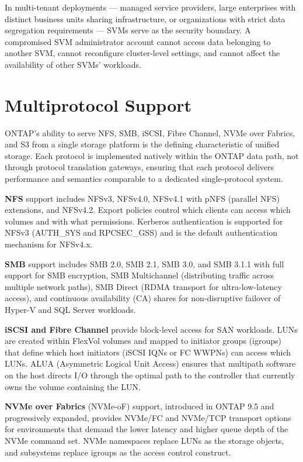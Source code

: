 In multi-tenant deployments --- managed service providers, large enterprises with distinct business units sharing infrastructure, or organizations with strict data segregation requirements --- SVMs serve as the security boundary. A compromised SVM administrator account cannot access data belonging to another SVM, cannot reconfigure cluster-level settings, and cannot affect the availability of other SVMs' workloads.

\section{Multiprotocol Support}

ONTAP's ability to serve NFS, SMB, iSCSI, Fibre Channel, NVMe over Fabrics, and S3 from a single storage platform is the defining characteristic of unified storage. Each protocol is implemented natively within the ONTAP data path, not through protocol translation gateways, ensuring that each protocol delivers performance and semantics comparable to a dedicated single-protocol system.

\textbf{NFS} support includes NFSv3, NFSv4.0, NFSv4.1 with pNFS (parallel NFS) extensions, and NFSv4.2. Export policies control which clients can access which volumes and with what permissions. Kerberos authentication is supported for NFSv3 (AUTH\_SYS and RPCSEC\_GSS) and is the default authentication mechanism for NFSv4.x.

\textbf{SMB} support includes SMB 2.0, SMB 2.1, SMB 3.0, and SMB 3.1.1 with full support for SMB encryption, SMB Multichannel (distributing traffic across multiple network paths), SMB Direct (RDMA transport for ultra-low-latency access), and continuous availability (CA) shares for non-disruptive failover of Hyper-V and SQL Server workloads.

\textbf{iSCSI and Fibre Channel} provide block-level access for SAN workloads. LUNs are created within FlexVol volumes and mapped to initiator groups (igroups) that define which host initiators (iSCSI IQNs or FC WWPNs) can access which LUNs. ALUA (Asymmetric Logical Unit Access) ensures that multipath software on the host directs I/O through the optimal path to the controller that currently owns the volume containing the LUN.

\textbf{NVMe over Fabrics} (NVMe-oF) support, introduced in ONTAP 9.5 and progressively expanded, provides NVMe/FC and NVMe/TCP transport options for environments that demand the lower latency and higher queue depth of the NVMe command set. NVMe namespaces replace LUNs as the storage objects, and subsystems replace igroups as the access control construct.

